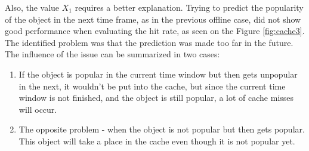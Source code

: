 Also, the value $X_1$ requires a better explanation. Trying to predict the popularity of the object in the next time frame, as in the previous offline case, did not show good performance when evaluating the hit rate, as seen on the Figure \ref{fig:cache3}. The identified problem was that the prediction was made too far in the future. The influence of the issue can be summarized in two cases:

\begin{enumerate}
	\item If the object is popular in the current time window but then gets unpopular in the next, it wouldn't be put into the cache, but since the current time window is not finished, and the object is still popular, a lot of cache misses will occur.
	\item The opposite problem - when the object is not popular but then gets popular. This object will take a place in the cache even though it is not popular yet.
\end{enumerate}
